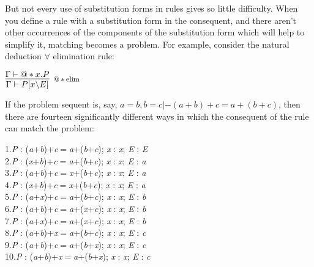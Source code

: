 \documentclass[11pt]{book}
\newcommand{\tab}{\hspace{5mm}}
\newcommand{\reason}[1]{\scalebox{0.85}{#1}}
\begin{document}
But not every use of substitution forms in rules gives so little difficulty. When you define a rule with a substitution form in the consequent, and there aren't other occurrences of the components of the substitution form which will help to simplify it, matching becomes a problem. For example, consider the natural deduction \ensuremath{\forall} elimination rule:


$\infer[\reason{$@*\operatorname{elim}$}]
       {\Gamma  |- P[x\backslash E]}
       {\Gamma  |- @*x.P}$

If the problem sequent is, say, $a=b,b=c |- (a+b)+c=a+(b+c)$, then there are fourteen significantly different ways in which the consequent of the rule can match the problem:

1.\tab \textit{P} : (\textit{a}+\textit{b})+\textit{c}\ensuremath{=}\textit{a}+(\textit{b}+\textit{c}); \textit{x} : \textit{x}; \textit{E} : \textit{E}\\
2.\tab \textit{P} : (\textit{x}+\textit{b})+\textit{c}\ensuremath{=}\textit{a}+(\textit{b}+\textit{c}); \textit{x} : \textit{x}; \textit{E} : \textit{a}\\
3.\tab \textit{P} : (\textit{a}+\textit{b})+\textit{c}\ensuremath{=}\textit{x}+(\textit{b}+\textit{c}); \textit{x} : \textit{x}; \textit{E} : \textit{a}\\
4.\tab \textit{P} : (\textit{x}+\textit{b})+\textit{c}\ensuremath{=}\textit{x}+(\textit{b}+\textit{c}); \textit{x} : \textit{x}; \textit{E} : \textit{a}\\
5.\tab \textit{P} : (\textit{a}+\textit{x})+\textit{c}\ensuremath{=}\textit{a}+(\textit{b}+\textit{c}); \textit{x} : \textit{x}; \textit{E} : \textit{b}\\
6.\tab \textit{P} : (\textit{a}+\textit{b})+\textit{c}\ensuremath{=}\textit{a}+(\textit{x}+\textit{c}); \textit{x} : \textit{x}; \textit{E} : \textit{b}\\
7.\tab \textit{P} : (\textit{a}+\textit{x})+\textit{c}\ensuremath{=}\textit{a}+(\textit{x}+\textit{c}); \textit{x} : \textit{x}; \textit{E} : \textit{b}\\
8.\tab \textit{P} : (\textit{a}+\textit{b})+\textit{x}\ensuremath{=}\textit{a}+(\textit{b}+\textit{c}); \textit{x} : \textit{x}; \textit{E} : \textit{c}\\
9.\tab \textit{P} : (\textit{a}+\textit{b})+\textit{c}\ensuremath{=}\textit{a}+(\textit{b}+\textit{x}); \textit{x} : \textit{x}; \textit{E} : \textit{c}\\
10.\tab \textit{P} : (\textit{a}+\textit{b})+\textit{x}\ensuremath{=}\textit{a}+(\textit{b}+\textit{x}); \textit{x} : \textit{x}; \textit{E} : \textit{c}\\
\end{document}
